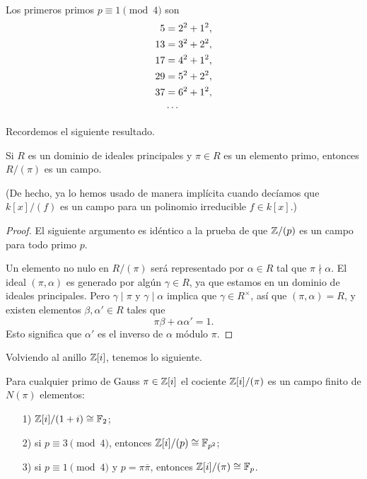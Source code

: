 \begin{ejemplo}
  Los primeros primos $p \equiv 1 \pmod{4}$ son
  \begin{align*}
    5 & = 2^2 + 1^2,\\
    13 & = 3^2 + 2^2,\\
    17 & = 4^2 + 1^2,\\
    29 & = 5^2 + 2^2,\\
    37 & = 6^2 + 1^2,\\
    & \cdots \qedhere
  \end{align*}
\end{ejemplo}


Recordemos el siguiente resultado.

\begin{proposicion}
  Si $R$ es un dominio de ideales principales y $\pi \in R$ es un elemento
  primo, entonces $R/(\pi)$ es un campo.
\end{proposicion}
(De hecho, ya lo hemos usado de manera implícita cuando decíamos que $k[x]/(f)$
es un campo para un polinomio irreducible $f \in k[x]$.)

\begin{proof}
  El siguiente argumento es idéntico a la prueba de que $\mathbb{Z}/(p)$ es un campo
  para todo primo $p$.

  Un elemento no nulo en $R/(\pi)$ será representado por $\alpha \in R$ tal
  que $\pi \nmid \alpha$. El ideal $(\pi,\alpha)$ es generado por algún
  $\gamma \in R$, ya que estamos en un dominio de ideales principales. Pero
  $\gamma\mid\pi$ y $\gamma\mid\alpha$ implica que $\gamma\in R^\times$, así
  que $(\pi,\alpha) = R$, y existen elementos $\beta,\alpha' \in R$
  tales que
  $$\pi\beta + \alpha\alpha' = 1.$$
  Esto significa que $\alpha'$ es el inverso de $\alpha$ módulo $\pi$.
\end{proof}

Volviendo al anillo $\mathbb{Z} [i]$, tenemos lo siguiente.

\begin{proposicion}
  Para cualquier primo de Gauss $\pi \in \mathbb{Z} [i]$ el cociente $\mathbb{Z} [i]/(\pi)$
  es un campo finito de $N (\pi)$ elementos:
  \begin{enumerate}
  \item[1)] $\mathbb{Z} [i]/(1+i) \cong \mathbb{F}_2$;
  \item[2)] si $p \equiv 3 \pmod{4}$, entonces $\mathbb{Z} [i]/(p) \cong \mathbb{F}_{p^2}$;
  \item[3)] si $p \equiv 1 \pmod{4}$ y $p = \pi \overline{\pi}$, entonces
    $\mathbb{Z} [i]/(\pi) \cong \mathbb{F}_p$.
  \end{enumerate}
\end{proposicion}

